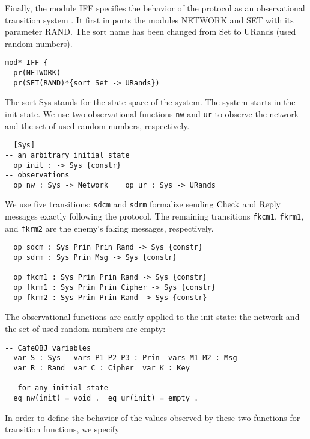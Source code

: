 \documentclass[a4paper,fleqn]{cas-dc}
\begin{document}
Finally, the module IFF specifies the behavior of the protocol as an observational transition system \cite{OgataF03fmoods}. It first imports the modules NETWORK and SET with its parameter RAND. The sort name has been changed from Set to URands (used random numbers).
\begin{small}
\begin{verbatim}
mod* IFF {
  pr(NETWORK)
  pr(SET(RAND)*{sort Set -> URands})
\end{verbatim}
\end{small}  
The sort Sys stands for the state space of the system. The system starts in the init state. We use two observational functions \verb!nw! and \verb!ur! to observe the network and the set of used random numbers, respectively.
\begin{small}
\begin{verbatim}
  [Sys]
-- an arbitrary initial state
  op init : -> Sys {constr}
-- observations
  op nw : Sys -> Network    op ur : Sys -> URands
\end{verbatim}
\end{small}  
We use five transitions: \verb!sdcm! and \verb!sdrm! formalize sending $\rm Check$ and $\rm Reply$ messages exactly following the protocol.
The remaining transitions \verb!fkcm1!, \verb!fkrm1!, and \verb!fkrm2! are the enemy's faking messages, respectively.
\begin{small}
\begin{verbatim}
  op sdcm : Sys Prin Prin Rand -> Sys {constr}
  op sdrm : Sys Prin Msg -> Sys {constr}
  --
  op fkcm1 : Sys Prin Prin Rand -> Sys {constr}
  op fkrm1 : Sys Prin Prin Cipher -> Sys {constr}
  op fkrm2 : Sys Prin Prin Rand -> Sys {constr}
\end{verbatim}
\end{small}
The observational functions are easily applied to the init state: the network and the set of used random numbers are empty:
\begin{small}
\begin{verbatim}
-- CafeOBJ variables
  var S : Sys   vars P1 P2 P3 : Prin  vars M1 M2 : Msg
  var R : Rand  var C : Cipher  var K : Key

-- for any initial state
  eq nw(init) = void .  eq ur(init) = empty .
\end{verbatim}
\end{small}
In order to define the behavior of the values observed by these two functions for transition functions, we specify
\end{document}
